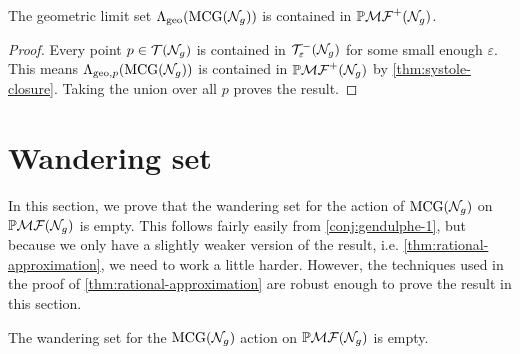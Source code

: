 \documentclass[12pt, reqno]{amsart}
\begin{document}
\begin{corollary}
  \label{cor:geolimset}
  The geometric limit set $\Lambda_{\mathrm{geo}}(\mathrm{MCG}(\mathcal{N}_g))$ is contained in $\mathbb{P}\mathcal{MF}^+(\mathcal{N}_g)$.
\end{corollary}
\begin{proof}
  Every point $p \in \mathcal{T}(\mathcal{N}_g)$ is contained in $\mathcal{T}_{\varepsilon}^{-}(\mathcal{N}_g)$ for some small enough $\varepsilon$.
  This means $\Lambda_{\mathrm{geo}, p}(\mathrm{MCG}(\mathcal{N}_g))$ is contained in $\mathbb{P}\mathcal{MF}^+(\mathcal{N}_g)$ by \autoref{thm:systole-closure}.
  Taking the union over all $p$ proves the result.
\end{proof}

\section{Wandering set}
\label{sec:domain-discontinuity}

In this section, we prove that the wandering set for the action of $\mathrm{MCG}(\mathcal{N}_g)$ on $\mathbb{P}\mathcal{MF}(\mathcal{N}_g)$ is empty.
This follows fairly easily from \autoref{conj:gendulphe-1}, but because we only have a slightly weaker version of the result, i.e. \autoref{thm:rational-approximation}, we need to work a little harder.
However, the techniques used in the proof of \autoref{thm:rational-approximation} are robust enough to prove the result in this section.
\begin{theorem}
  \label{thm:dod-is-empty}
  The wandering set for the $\mathrm{MCG}(\mathcal{N}_g)$ action on $\mathbb{P}\mathcal{MF}(\mathcal{N}_g)$ is empty.
\end{theorem}
\end{document}
